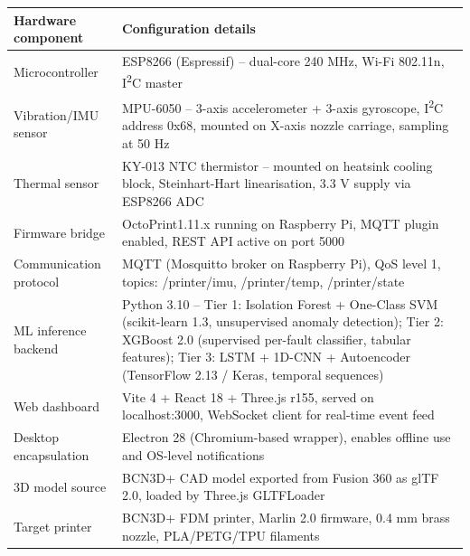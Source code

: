 \begin{tabular}{|L{4.5cm}|L{8.5cm}|}
	\hline
	\textbf{\color{white}Hardware component} & \textbf{\color{white}Configuration details} \\
	\hline
	Microcontroller & ESP8266 (Espressif) -- dual-core 240 MHz, Wi-Fi 802.11n, I\textsuperscript{2}C master \\
	\hline
	Vibration/IMU sensor & MPU-6050 -- 3-axis accelerometer + 3-axis gyroscope, I\textsuperscript{2}C address 0x68, mounted on X-axis nozzle carriage, sampling at 50 Hz \\
	\hline
	Thermal sensor & KY-013 NTC thermistor -- mounted on heatsink cooling block, Steinhart-Hart linearisation, 3.3 V supply via ESP8266 ADC \\
	\hline
	Firmware bridge & OctoPrint1.11.x running on Raspberry Pi, MQTT plugin enabled, REST API active on port 5000 \\
	\hline
	Communication protocol & MQTT (Mosquitto broker on Raspberry Pi), QoS level 1, topics: /printer/imu, /printer/temp, /printer/state \\
	\hline
	ML inference backend & Python 3.10 -- Tier 1: Isolation Forest + One-Class SVM (scikit-learn 1.3, unsupervised anomaly detection); Tier 2: XGBoost 2.0 (supervised per-fault classifier, tabular features); Tier 3: LSTM + 1D-CNN + Autoencoder (TensorFlow 2.13 / Keras, temporal sequences) \\
	\hline
	Web dashboard & Vite 4 + React 18 + Three.js r155, served on localhost:3000, WebSocket client for real-time event feed \\
	\hline
	Desktop encapsulation & Electron 28 (Chromium-based wrapper), enables offline use and OS-level notifications \\
	\hline
	3D model source & BCN3D+ CAD model exported from Fusion 360 as glTF 2.0, loaded by Three.js GLTFLoader \\
	\hline
	Target printer & BCN3D+ FDM printer, Marlin 2.0 firmware, 0.4 mm brass nozzle, PLA/PETG/TPU filaments \\
	\hline
\end{tabular}